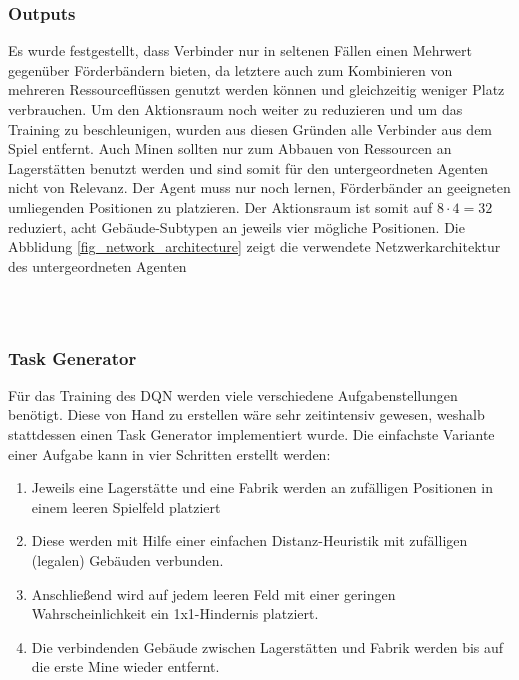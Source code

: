 \subsubsection*{Outputs}
Es wurde festgestellt, dass Verbinder nur in seltenen Fällen einen Mehrwert gegenüber Förderbändern bieten, da letztere auch zum Kombinieren von mehreren Ressourceflüssen genutzt werden können und gleichzeitig weniger Platz verbrauchen. 
Um den Aktionsraum noch weiter zu reduzieren und um das Training zu beschleunigen, wurden aus diesen Gründen alle Verbinder aus dem Spiel entfernt. Auch Minen sollten nur zum Abbauen von Ressourcen an Lagerstätten benutzt werden und sind somit für den untergeordneten Agenten nicht von Relevanz. Der Agent muss nur noch lernen, Förderbänder an geeigneten umliegenden Positionen zu platzieren. Der Aktionsraum ist somit auf $8 \cdot 4 = 32$ reduziert, acht Gebäude-Subtypen an jeweils vier mögliche Positionen. Die Abblidung \ref{fig_network_architecture} zeigt die verwendete Netzwerkarchitektur des untergeordneten Agenten
\begin{verbatim}
	
	
\end{verbatim}


\subsubsection*{Task Generator}
Für das Training des DQN werden viele verschiedene Aufgabenstellungen benötigt. Diese von Hand zu erstellen wäre sehr zeitintensiv gewesen, weshalb stattdessen einen Task Generator implementiert wurde.
\newpage
Die einfachste Variante einer Aufgabe kann in vier Schritten erstellt werden:
\begin{enumerate}
	\item Jeweils eine Lagerstätte und eine Fabrik werden an zufälligen Positionen in einem leeren Spielfeld platziert
	\item Diese werden mit Hilfe einer einfachen Distanz-Heuristik mit zufälligen (legalen) Gebäuden verbunden. 
	\item Anschließend wird auf jedem leeren Feld mit einer geringen Wahrscheinlichkeit ein 1x1-Hindernis platziert. 
	\item Die verbindenden Gebäude zwischen Lagerstätten und Fabrik werden bis auf die erste Mine wieder entfernt. 
\end{enumerate}

